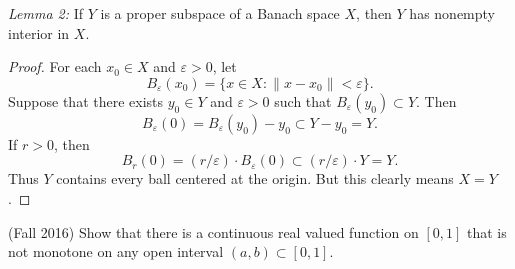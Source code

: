 \documentclass{exam}
\theoremstyle{problemstyle}
\newcommand{\norm}[1]{\left\lVert#1\right\rVert} %
\newcommand{\1}[1]{\textbf{1}_{\left[#1\right]}} %
\def\Q{\mathbb{Q}} %
\begin{document}
\begin{questions}
\begin{solution}
  \noindent \textit{Lemma 2:} If $Y$ is a proper subspace of a Banach space $X$, then $Y$ has nonempty interior in $X$.
  \begin{proof}
  	For each $x_0 \in X$ and $\varepsilon > 0$, let
  	\[ B_\varepsilon(x_0) = \{ x \in X: \| x - x_0 \| < \varepsilon \}. \]
  	Suppose that there exists $y_0 \in Y$ and $\varepsilon > 0$ such that $B_\varepsilon(y_0) \subset Y$. Then
  	\[ B_\varepsilon(0) = B_\varepsilon(y_0) - y_0 \subset Y - y_0 = Y. \]
  	If $r > 0$, then
  	\[ B_r(0) = (r / \varepsilon) \cdot B_\varepsilon(0) \subset (r / \varepsilon) \cdot Y = Y. \]
  	Thus $Y$ contains every ball centered at the origin. But this clearly means $X = Y$.
  \end{proof}
\end{solution}

\item (Fall 2016) Show that there is a continuous real valued function on $[0,1]$ that is not monotone on any open interval $(a,b)\subset [0,1]$.

  


\end{questions}
\end{document}
